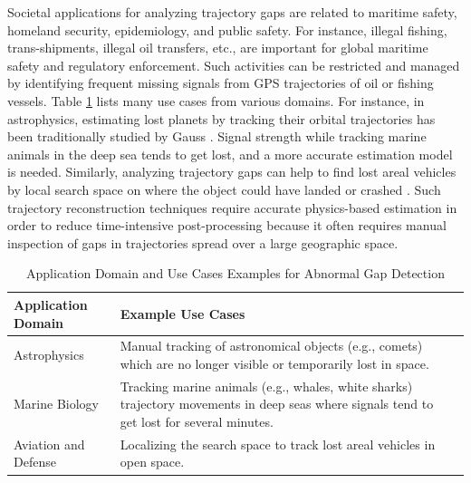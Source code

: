 \documentclass[acmsmall]{acmart}
\begin{document}

Societal applications for analyzing trajectory gaps are related to maritime safety, homeland security, epidemiology, and public safety. For instance, illegal fishing, trans-shipments, illegal oil transfers, etc., are important for global maritime safety and regulatory enforcement. Such activities can be restricted and managed by identifying frequent missing signals from GPS trajectories of oil or fishing vessels. Table \ref{ApplicationDomain} lists many use cases from various domains. For instance, in astrophysics, estimating lost planets by tracking their orbital trajectories has been traditionally studied by Gauss \cite{astronomy}. Signal strength while tracking marine animals in the deep sea tends to get lost, and a more accurate estimation model is needed. Similarly, analyzing trajectory gaps can help to find lost areal vehicles by local search space on where the object could have landed or crashed \cite{spaceshuttle}. Such trajectory reconstruction techniques require accurate physics-based estimation in order to reduce time-intensive post-processing because it often requires manual inspection of gaps in trajectories spread over a large geographic space.


\begin{table}\scriptsize
\footnotesize
\centering
\caption{Application Domain and Use Cases Examples for Abnormal Gap Detection}
\label{ApplicationDomain}
\begin{tabular}{p{3.0cm}p{9cm}p{5cm}}
\hline
Application Domain  &  Example Use Cases\\ 
\hline
Astrophysics   & Manual tracking of astronomical objects (e.g., comets) which are no longer visible or temporarily lost in space.\\ 
\hline
Marine Biology  & Tracking marine animals (e.g., whales, white sharks) trajectory movements in deep seas where signals tend to get lost for several minutes.\\ 
\hline
Aviation and Defense & Localizing the search space to track lost areal vehicles in open space.\\ 
\hline
\end{tabular}
\end{table}
\end{document}
